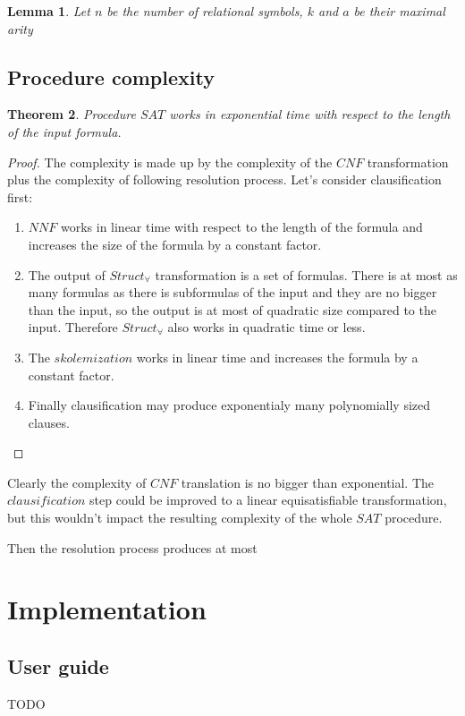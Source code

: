 \documentclass[english, shortabstract]{iithesis}
\theoremstyle{definition} \newtheorem{definition}{Definition}[chapter]
\theoremstyle{remark} \newtheorem{remark}[definition]{Observation}
\theoremstyle{plain} \newtheorem{theorem}[definition]{Theorem}
\theoremstyle{plain} \newtheorem{lemma}[definition]{Lemma}
\begin{document}
\begin{lemma}
Let $n$ be the number of relational symbols, $k$ and $a$ be their maximal arity
\end{lemma}

\section{Procedure complexity}

\begin{theorem}
Procedure $SAT$ works in exponential time with respect to the length of the input formula. 
\end{theorem}

\begin{proof}
The complexity is made up by the complexity of the $CNF$ transformation plus the complexity of following resolution process.
Let's consider clausification first:
\begin{enumerate}
    \item $NNF$ works in linear time with respect to the length of the formula and increases the size of the formula by a constant factor.
    \item The output of $Struct_{\forall}$ transformation is a set of formulas. There is at most as many formulas as there is 
    subformulas of the input and they are no bigger than the input, so the output is at most of quadratic size compared to the input.
    Therefore $Struct_\forall$ also works in quadratic time or less.
    \item The $skolemization$ works in linear time and increases the formula by a constant factor.
    \item Finally clausification may produce exponentialy many polynomially sized clauses.
\end{enumerate}
\end{proof}
Clearly the complexity of $CNF$ translation is no bigger than exponential.
The $clausification$ step could be improved to a linear equisatisfiable transformation,
but this wouldn't impact the resulting complexity of the whole $SAT$ procedure.

Then the resolution process produces at most 

\chapter{Implementation}

\section{User guide}

TODO


\end{document}
